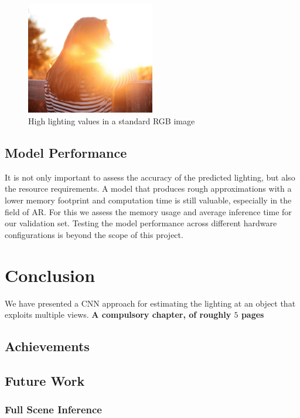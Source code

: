 \documentclass[ %
                    author={Gavin Parker},
                supervisor={Dr. Neill Campbell},
                    degree={MEng},
                     title={Deep Siamese Networks for Illumination Estimation from Stereo Images},
                  subtitle={},
                      type={research},
                      year={2018} ]{dissertation}
\begin{document}
\begin{figure}[h]
\centering
\includegraphics[width=0.5\textwidth]{exposure_example}
\caption{High lighting values in a standard RGB image}
\label{rgb_example}
\end{figure}

\section{Model Performance}
It is not only important to assess the accuracy of the predicted lighting, but also the resource requirements. A model that produces rough approximations with a lower memory footprint and computation time is still valuable, especially in the field of AR. For this we assess the memory usage and average inference time for our validation set. Testing the model performance across different hardware configurations is beyond the scope of this project.

\chapter{Conclusion}
\label{chap:conclusion}
We have presented a CNN approach for estimating the lighting at an object that exploits multiple views.
{\bf A compulsory chapter,     of roughly $5$ pages} 
\vspace{1cm} 

\noindent
\section{Achievements}
\section{Future Work}
\subsection{Full Scene Inference}
\end{document}
